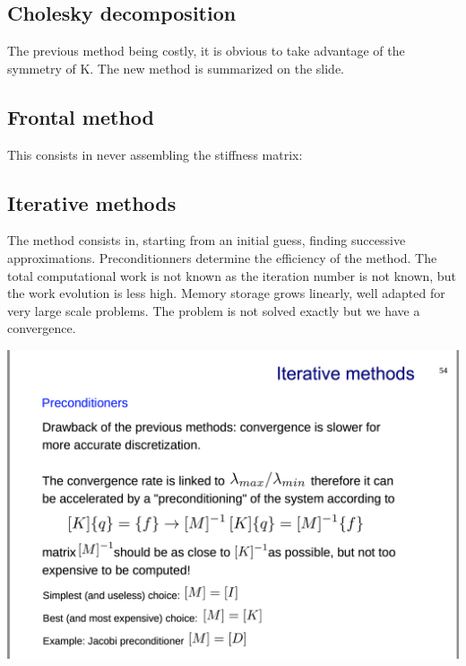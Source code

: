 	
\subsection{Cholesky decomposition}
	The previous method being costly, it is obvious to take advantage of the symmetry of K. The new method is summarized on the slide. 
	
	\newpage
\subsection{Frontal method}
	This consists in never assembling the stiffness matrix: 
	
\subsection{Iterative methods}
	The method consists in, starting from an initial guess, finding successive approximations. Preconditionners determine the efficiency of the method. The total computational work is not known as the iteration number is not known, but the work evolution is less high. Memory storage grows linearly, well adapted for very large scale problems. The problem is not solved exactly but we have a convergence. 
	
	
	\begin{center}
	\includegraphics[scale=0.15]{ch11/18}
	\end{center}
	